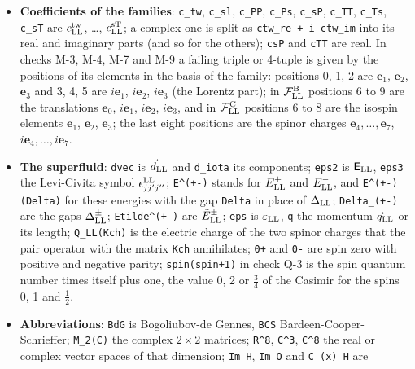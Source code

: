 \documentclass[
  10pt,
]{article}
\begin{document}
\begin{itemize}
  formula shows.
\item
  \textbf{Coefficients of the families}: \texttt{c\_tw}, \texttt{c\_sl},
  \texttt{c\_PP}, \texttt{c\_Ps}, \texttt{c\_sP}, \texttt{c\_TT},
  \texttt{c\_Ts}, \texttt{c\_sT} are \(c^{\rm tw}_{\rm LL}\), \ldots,
  \(c^{\rm sT}_{\rm LL}\); a complex one is split as
  \texttt{ctw\_re\ +\ i\ ctw\_im} into its real and imaginary parts (and
  so for the others); \texttt{csP} and \texttt{cTT} are real. In checks
  M-3, M-4, M-7 and M-9 a failing triple or 4-tuple is given by the
  positions of its elements in the basis of the family: positions 0, 1,
  2 are \(\mathbf e_1\), \(\mathbf e_2\), \(\mathbf e_3\) and 3, 4, 5
  are \(i\mathbf e_1\), \(i\mathbf e_2\), \(i\mathbf e_3\) (the Lorentz
  part); in \(\mathcal F^{\rm B}_{\rm LL}\) positions 6 to 9 are the
  translations \(\mathbf e_0\), \(i\mathbf e_1\), \(i\mathbf e_2\),
  \(i\mathbf e_3\), and in \(\mathcal F^{\rm C}_{\rm LL}\) positions 6
  to 8 are the isospin elements \(\mathbf e_1\), \(\mathbf e_2\),
  \(\mathbf e_3\); the last eight positions are the spinor charges
  \(\mathbf e_4,\dots,\mathbf e_7\),
  \(i\mathbf e_4,\dots,i\mathbf e_7\).
\item
  \textbf{The superfluid}: \texttt{dvec} is \(\vec d_{\rm LL}\) and
  \texttt{d\_iota} its components; \texttt{eps2} is
  \(\mathsf E_{\rm LL}\), \texttt{eps3} the Levi-Civita symbol
  \(\epsilon^{\rm LL}_{jj'j''}\); \texttt{E\^{}(+-)} stands for
  \(E^+_{\rm LL}\) and \(E^-_{\rm LL}\), and \texttt{E\^{}(+-)(Delta)}
  for these energies with the gap \texttt{Delta} in place of
  \(\Delta_{\rm LL}\); \texttt{Delta\_(+-)} are the gaps
  \(\Delta^\pm_{\rm LL}\); \texttt{Etilde\^{}(+-)} are
  \(\tilde E^\pm_{\rm LL}\); \texttt{eps} is \(\varepsilon_{\rm LL}\),
  \texttt{q} the momentum \(\vec q_{\rm LL}\) or its length;
  \texttt{Q\_LL(Kch)} is the electric charge of the two spinor charges
  that the pair operator with the matrix \texttt{Kch} annihilates;
  \texttt{0+} and \texttt{0-} are spin zero with positive and negative
  parity; \texttt{spin(spin+1)} in check Q-3 is the spin quantum number
  times itself plus one, the value 0, 2 or \(\tfrac34\) of the Casimir
  for the spins 0, 1 and \(\tfrac12\).
\item
  \textbf{Abbreviations}: \texttt{BdG} is Bogoliubov-de Gennes,
  \texttt{BCS} Bardeen-Cooper-Schrieffer; \texttt{M\_2(C)} the complex
  \(2\times2\) matrices; \texttt{R\^{}8}, \texttt{C\^{}3},
  \texttt{C\^{}8} the real or complex vector spaces of that dimension;
  \texttt{Im\ H}, \texttt{Im\ O} and \texttt{C\ (x)\ H} are

\end{itemize}
\end{document}
